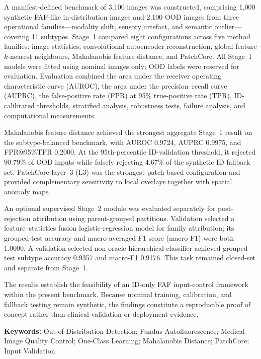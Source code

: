 \documentclass[fleqn,12pt]{olplainarticle}
\begin{document}
A manifest-defined benchmark of 3,100 images was constructed, comprising
1,000 synthetic FAF-like in-distribution images and 2,100 OOD images from
three operational families---modality shift, sensory artefact, and semantic
outlier---covering 11 subtypes. Stage~1 compared eight configurations across
five method families: image statistics, convolutional autoencoder
reconstruction, global feature $k$-nearest neighbours, Mahalanobis feature
distance, and PatchCore. All Stage~1 models were fitted using nominal images
only; OOD labels were reserved for evaluation. Evaluation combined the area
under the receiver operating characteristic curve (AUROC), the area under the
precision--recall curve (AUPRC), the false-positive rate (FPR) at 95\%
true-positive rate (TPR), ID-calibrated thresholds, stratified analysis,
robustness tests, failure analysis, and computational measurements.

Mahalanobis feature distance achieved the strongest aggregate Stage~1 result
on the subtype-balanced benchmark, with AUROC 0.9724, AUPRC 0.9975, and
FPR@95\%TPR 0.2000. At the 95th-percentile ID-validation threshold, it
rejected 90.79\% of OOD inputs while falsely rejecting 4.67\% of the synthetic
ID fallback set. PatchCore layer~3 (L3) was the strongest patch-based
configuration and
provided complementary sensitivity to local overlays together with spatial
anomaly maps.

An optional supervised Stage~2 module was evaluated separately for
post-rejection attribution using parent-grouped partitions. Validation selected
a feature--statistics fusion logistic-regression model for family attribution;
its grouped-test accuracy and macro-averaged F1 score (macro-F1) were both
1.0000. A validation-selected
non-oracle hierarchical classifier achieved grouped-test subtype accuracy
0.9357 and macro-F1 0.9176. This task remained closed-set and separate from
Stage~1.

The results establish the feasibility of an ID-only FAF input-control
framework within the present benchmark. Because nominal training,
calibration, and fallback testing remain synthetic, the findings constitute a
reproducible proof of concept rather than clinical validation or deployment
evidence.

\vspace{0.8em}
\noindent\textbf{Keywords:}
Out-of-Distribution Detection; Fundus Autofluorescence; Medical Image Quality
Control; One-Class Learning; Mahalanobis Distance; PatchCore; Input Validation.

\clearpage
\end{document}
